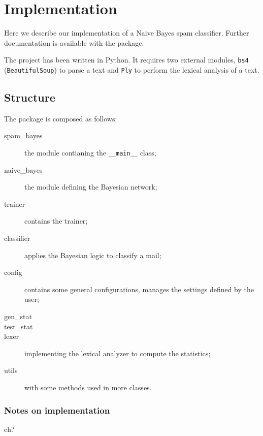 \section{Implementation}
Here we describe our implementation of a Naive Bayes spam classifier. Further documentation is available with the package.

The project has been written in Python. It requires two external modules, \verb!bs4! (\verb!BeautifulSoup!) to parse a text and \verb!Ply! to perform the lexical analysis of a text.

\subsection{Structure}
The package is composed as follows:
\begin{description}
  \item[spam\_bayes] the module contianing the \verb!__main__! class;
  \item[naive\_bayes] the module defining the Bayesian network;
  \item[trainer] contains the trainer;
  \item[classifier] applies the Bayesian logic to classify a mail;
  \item[config] contains some general configurations, manages the settings defined by the user;
  \item[gen\_stat] 
  \item[test\_stat]
  \item[lexer] implementing the lexical analyzer to compute the statistics;
  \item[utils] with some methods used in more classes.
\end{description}

\subsubsection{Notes on implementation}
eh?

